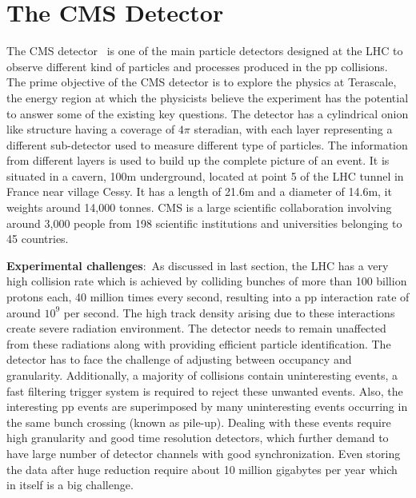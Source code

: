 \section{The CMS Detector}
The CMS detector~\cite{Chatrchyan:2008aa} is one of the main particle detectors designed at the LHC to observe different kind of particles and processes
produced in the pp collisions. The prime objective of the CMS detector is to explore the physics at Terascale, the energy region at which the physicists believe
the experiment has the potential to answer some of the existing key questions. The detector has a cylindrical onion like structure having a coverage of $4\pi$ steradian,
with each layer representing a different sub-detector used to measure different type of particles. The information from different layers is used to build up
the complete picture of an event. It is situated in a cavern, 100\unit{m} underground, located at point 5 of the LHC tunnel in France near village Cessy.
It has a length of 21.6\unit{m} and a diameter of 14.6\unit{m}, it weights around 14,000 tonnes.
CMS is a large scientific collaboration involving around 3,000 people from 198 scientific institutions and universities belonging to 45 countries.

\noindent
{\bf{Experimental challenges}}:\ As discussed in last section, the LHC has a very high collision rate which is achieved by colliding bunches of more than 100 billion
protons each, 40 million times every second, resulting into a pp interaction rate of around $10^{9}$ per second.
The high track density arising due to these interactions create severe radiation environment. The detector needs to remain unaffected from these radiations along with
providing efficient particle identification. The detector has to face the challenge of adjusting between occupancy and granularity.
Additionally, a majority of collisions contain uninteresting events, a fast filtering trigger system is required to reject these unwanted events.
Also, the interesting pp events are superimposed by many uninteresting events occurring in the same bunch crossing (known as pile-up).
Dealing with these events require high granularity and good time resolution detectors, which further demand to have large number of detector channels with
good synchronization. Even storing the data after huge reduction require about 10 million gigabytes per year which in itself is a big challenge.

